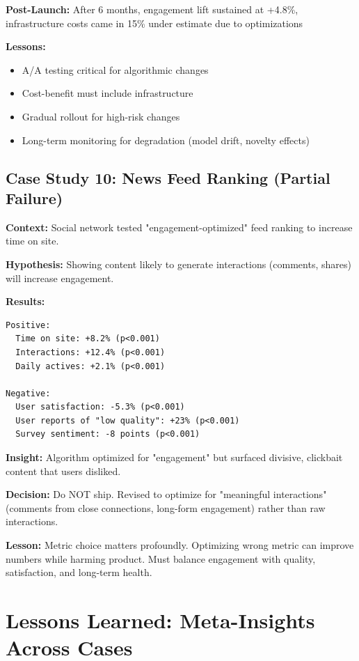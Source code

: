 \textbf{Post-Launch:} After 6 months, engagement lift sustained at +4.8\%, infrastructure costs came in 15\% under estimate due to optimizations

\textbf{Lessons:}
\begin{itemize}
    \item A/A testing critical for algorithmic changes
    \item Cost-benefit must include infrastructure
    \item Gradual rollout for high-risk changes
    \item Long-term monitoring for degradation (model drift, novelty effects)
\end{itemize}

\subsection{Case Study 10: News Feed Ranking (Partial Failure)}

\textbf{Context:} Social network tested "engagement-optimized" feed ranking to increase time on site.

\textbf{Hypothesis:} Showing content likely to generate interactions (comments, shares) will increase engagement.

\textbf{Results:}
\begin{verbatim}
Positive:
  Time on site: +8.2% (p<0.001)
  Interactions: +12.4% (p<0.001)
  Daily actives: +2.1% (p<0.001)

Negative:
  User satisfaction: -5.3% (p<0.001)
  User reports of "low quality": +23% (p<0.001)
  Survey sentiment: -8 points (p<0.001)
\end{verbatim}

\textbf{Insight:} Algorithm optimized for "engagement" but surfaced divisive, clickbait content that users disliked.

\textbf{Decision:} Do NOT ship. Revised to optimize for "meaningful interactions" (comments from close connections, long-form engagement) rather than raw interactions.

\textbf{Lesson:} Metric choice matters profoundly. Optimizing wrong metric can improve numbers while harming product. Must balance engagement with quality, satisfaction, and long-term health.

\section{Lessons Learned: Meta-Insights Across Cases}

